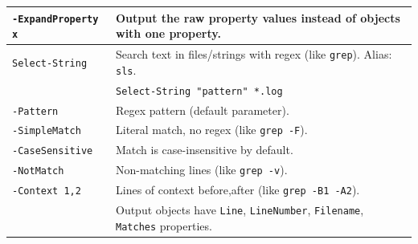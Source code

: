 \begin{tabularx}{\linewidth}{lX}
    \texttt{-ExpandProperty x} & Output the raw property values instead of objects with one property.\\
    \hline
    \texttt{Select-String} & Search text in files/strings with regex (like \texttt{grep}). Alias: \texttt{sls}.\\
    & \texttt{Select-String "pattern" *.log}\\
    \texttt{-Pattern} & Regex pattern (default parameter).\\
    \texttt{-SimpleMatch} & Literal match, no regex (like \texttt{grep -F}).\\
    \texttt{-CaseSensitive} & Match is case-insensitive by default.\\
    \texttt{-NotMatch} & Non-matching lines (like \texttt{grep -v}).\\
    \texttt{-Context 1,2} & Lines of context before,after (like \texttt{grep -B1 -A2}).\\
    & Output objects have \texttt{Line}, \texttt{LineNumber}, \texttt{Filename}, \texttt{Matches} properties.\\
    \hline
\end{tabularx}

